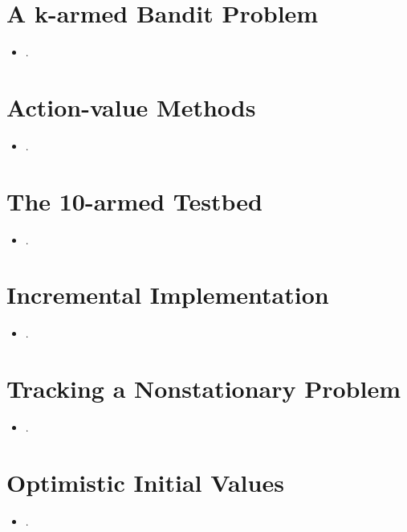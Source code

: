 \documentclass{article}
\begin{document}
\maketitle

\section{A k-armed Bandit Problem}
\begin{itemize}
    \item .
\end{itemize}

\section{Action-value Methods}
\begin{itemize}
    \item .
\end{itemize}

\section{The 10-armed Testbed}
\begin{itemize}
    \item .
\end{itemize}

\section{Incremental Implementation}
\begin{itemize}
    \item .
\end{itemize}

\section{Tracking a Nonstationary Problem}
\begin{itemize}
    \item .
\end{itemize}

\section{Optimistic Initial Values}
\begin{itemize}
    \item .
\end{itemize}
\end{document}
